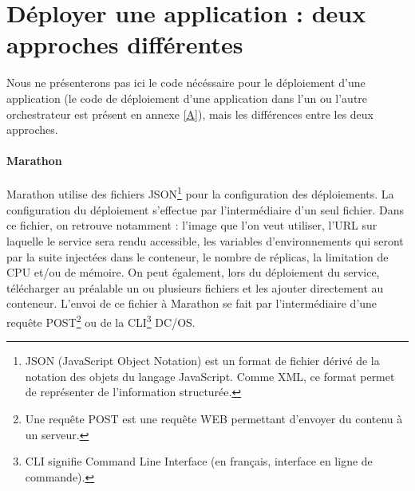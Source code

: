 \documentclass[11pt,fleqn]{book} %
\begin{document}
\section{Déployer une application : deux approches différentes}
Nous ne présenterons pas ici le code nécéssaire pour le déploiement d'une application (le code de déploiement d'une application dans l'un ou l'autre orchestrateur est présent en annexe \ref{A}), mais les différences entre les deux approches.
\paragraph{Marathon}
 Marathon utilise des fichiers JSON\footnote{JSON (JavaScript Object Notation) est un format de fichier dérivé de la notation des objets du langage JavaScript. Comme XML, ce format permet de représenter de l’information structurée.} pour la configuration des déploiements. La configuration du déploiement s'effectue par l'intermédiaire d'un seul fichier. Dans ce fichier, on retrouve notamment : l'image que l'on veut utiliser, l'URL sur laquelle le service sera rendu accessible, les variables d'environnements qui seront par la suite injectées dans le conteneur, le nombre de réplicas, la limitation de CPU et/ou de mémoire. On peut également, lors du déploiement du service, télécharger au préalable un ou plusieurs fichiers et les ajouter directement au conteneur. L'envoi de ce fichier à Marathon se fait par l'intermédiaire d'une requête POST\footnote{Une requête POST est une requête WEB permettant d'envoyer du contenu à un serveur.} ou de la CLI\footnote{CLI signifie Command Line Interface (en français, interface en ligne de commande).} DC/OS.
 
\end{document}
